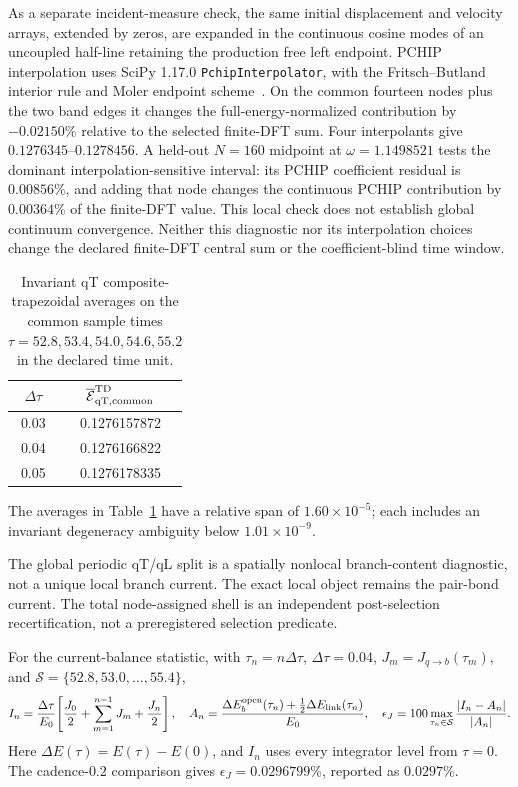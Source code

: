 \documentclass[10pt,aps,onecolumn,notitlepage,nofootinbib]{revtex4-2}
\newcommand{\qT}{\mathrm{qT}}
\begin{document}
As a separate incident-measure check, the same initial displacement and velocity arrays, extended by zeros, are expanded in the continuous cosine modes of an uncoupled half-line retaining the production free left endpoint. PCHIP interpolation uses SciPy 1.17.0 \texttt{PchipInterpolator}, with the Fritsch--Butland interior rule and Moler endpoint scheme~\cite{FritschButland1984,Moler2004,SciPy2020}. On the common fourteen nodes plus the two band edges it changes the full-energy-normalized contribution by $-0.02150\%$ relative to the selected finite-DFT sum. Four interpolants give $0.1276345$--$0.1278456$. A held-out $N=160$ midpoint at $\omega=1.1498521$ tests the dominant interpolation-sensitive interval: its PCHIP coefficient residual is $0.00856\%$, and adding that node changes the continuous PCHIP contribution by $0.00364\%$ of the finite-DFT value. This local check does not establish global continuum convergence. Neither this diagnostic nor its interpolation choices change the declared finite-DFT central sum or the coefficient-blind time window.

\begin{table}[htbp]
\squeezetable
\caption{Invariant qT composite-trapezoidal averages on the common sample times $\tau=52.8,53.4,54.0,54.6,55.2$ in the declared time unit.}
\label{tab:sm-timestep-common}
\begin{ruledtabular}\begin{tabular}{cc}
$\Delta\tau$&$\overline{\mathcal E}_{\qT,{\rm common}}^{\rm TD}$\\\hline
0.03&0.1276157872\\
0.04&0.1276166822\\
0.05&0.1276178335\\
\end{tabular}\end{ruledtabular}
\end{table}
The averages in Table~\ref{tab:sm-timestep-common} have a relative span of $1.60\times10^{-5}$; each includes an invariant degeneracy ambiguity below $1.01\times10^{-9}$.

The global periodic qT/qL split is a spatially nonlocal branch-content diagnostic, not a unique local branch current. The exact local object remains the pair-bond current. The total node-assigned shell is an independent post-selection recertification, not a preregistered selection predicate.

For the current-balance statistic, with $\tau_n=n\Delta\tau$, $\Delta\tau=0.04$, $J_m=J_{q\to b}(\tau_m)$, and $\mathcal S=\{52.8,53.0,\ldots,55.4\}$,
\begin{equation}
 I_n=\frac{\Delta\tau}{E_0}\!\left[\frac{J_0}{2}+\sum_{m=1}^{n-1}J_m+\frac{J_n}{2}\right],\quad
 A_n=\frac{\Delta E_b^{\rm open}(\tau_n)+\frac12\Delta E_{\rm link}(\tau_n)}{E_0},\quad
 \epsilon_J=100\max_{\tau_n\in\mathcal S}\frac{|I_n-A_n|}{|A_n|}.
\end{equation}
Here $\Delta E(\tau)=E(\tau)-E(0)$, and $I_n$ uses every integrator level from $\tau=0$. The cadence-$0.2$ comparison gives $\epsilon_J=0.0296799\%$, reported as $0.0297\%$.
\end{document}
